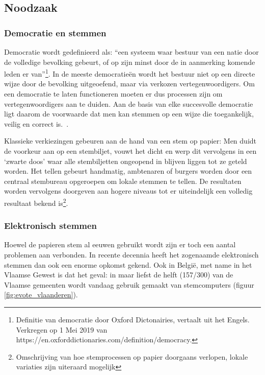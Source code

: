 	\subsection{Noodzaak}
			\subsubsection{Democratie en stemmen}
			Democratie wordt gedefinieerd als: ``een systeem waar bestuur van een natie door de volledige bevolking gebeurt, of op zijn minst door de in aanmerking komende leden er van''\footnote{ Definitie van democratie door Oxford Dictonairies, vertaalt uit het Engels. Verkregen op 1 Mei 2019 van https://en.oxforddictionaries.com/definition/democracy.}. In de meeste democratieën wordt het bestuur niet op een directe wijze door de bevolking uitgeoefend, maar via verkozen vertegenwoordigers. Om een democratie te laten functioneren moeten er dus processen zijn om vertegenwoordigers aan te duiden.  Aan de basis van elke succesvolle democratie ligt daarom de voorwaarde dat men kan stemmen op een wijze die toegankelijk, veilig en correct is.~\autocite{Osgood2016}. 
			
			Klassieke verkiezingen gebeuren aan de hand van een stem op papier: Men duidt de voorkeur aan op een stembiljet, vouwt het dicht en werp dit vervolgens in een `zwarte doos' waar alle stembiljetten ongeopend in blijven liggen tot ze geteld worden. Het tellen gebeurt handmatig, ambtenaren of burgers worden door een centraal stembureau opgeroepen om lokale stemmen te tellen. De resultaten worden vervolgens doorgeven aan hogere niveaus tot er uiteindelijk een volledig resultaat bekend is\footnote{ Omschrijving van hoe stemprocessen op papier doorgaans verlopen, lokale variaties zijn uiteraard mogelijk}.
			
			\subsubsection{Elektronisch stemmen}
			Hoewel de papieren stem al eeuwen gebruikt wordt zijn er toch een aantal problemen aan verbonden. In recente decennia heeft het zogenaamde elektronisch stemmen dan ook een enorme opkomst gekend. Ook in België, met name in het Vlaamse Gewest is dat het geval: in maar liefst de helft (157/300) van de Vlaamse gemeenten wordt vandaag gebruik gemaakt van stemcomputers (figuur \ref{fig:evote_vlaanderen}).
			
